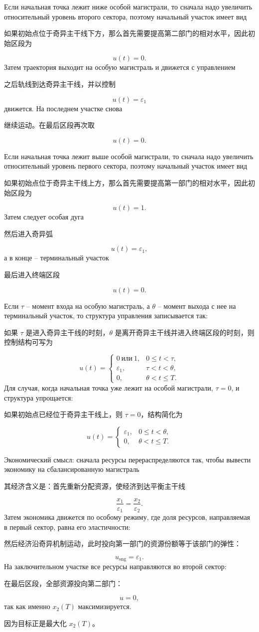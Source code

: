 \documentclass[12pt,a4paper]{article}
\newcommand{\eps}{\varepsilon}
\newcommand{\sng}{\mathrm{sng}}
\newcommand{\zh}[1]{\par\noindent #1\par}
\begin{document}
Если начальная точка лежит ниже особой магистрали, то сначала надо увеличить относительный уровень второго сектора, поэтому начальный участок имеет вид
\zh{如果初始点位于奇异主干线下方，那么首先需要提高第二部门的相对水平，因此初始区段为}
\[
    u(t)=0.
\]
Затем траектория выходит на особую магистраль и движется с управлением
\zh{之后轨线到达奇异主干线，并以控制}
\[
    u(t)=\eps_1
\]
движется. На последнем участке снова
\zh{继续运动。在最后区段再次取}
\[
    u(t)=0.
\]

Если начальная точка лежит выше особой магистрали, то сначала надо увеличить относительный уровень первого сектора, поэтому начальный участок имеет вид
\zh{如果初始点位于奇异主干线上方，那么首先需要提高第一部门的相对水平，因此初始区段为}
\[
    u(t)=1.
\]
Затем следует особая дуга
\zh{然后进入奇异弧}
\[
    u(t)=\eps_1,
\]
а в конце -- терминальный участок
\zh{最后进入终端区段}
\[
    u(t)=0.
\]

Если \(\tau\) -- момент входа на особую магистраль, а \(\theta\) -- момент выхода с нее на терминальный участок, то структура управления записывается так:
\zh{如果 \(\tau\) 是进入奇异主干线的时刻，\(\theta\) 是离开奇异主干线并进入终端区段的时刻，则控制结构可写为}
\[
    u(t)=
    \begin{cases}
        0\ \text{или}\ 1, & 0\le t<\tau,\\
        \eps_1, & \tau<t<\theta,\\
        0, & \theta<t\le T.
    \end{cases}
\]
Для случая, когда начальная точка уже лежит на особой магистрали, \(\tau=0\), и структура упрощается:
\zh{如果初始点已经位于奇异主干线上，则 \(\tau=0\)，结构简化为}
\[
    u(t)=
    \begin{cases}
        \eps_1, & 0\le t<\theta,\\
        0, & \theta<t\le T.
    \end{cases}
\]

Экономический смысл: сначала ресурсы перераспределяются так, чтобы вывести экономику на сбалансированную магистраль
\zh{其经济含义是：首先重新分配资源，使经济到达平衡主干线}
\[
    \frac{x_1}{\eps_1}=\frac{x_2}{\eps_2}.
\]
Затем экономика движется по особому режиму, где доля ресурсов, направляемая в первый сектор, равна его эластичности:
\zh{然后经济沿奇异机制运动，此时投向第一部门的资源份额等于该部门的弹性：}
\[
    u_{\sng}=\eps_1.
\]
На заключительном участке все ресурсы направляются во второй сектор:
\zh{在最后区段，全部资源投向第二部门：}
\[
    u=0,
\]
так как именно \(x_2(T)\) максимизируется.
\zh{因为目标正是最大化 \(x_2(T)\)。}
\end{document}
